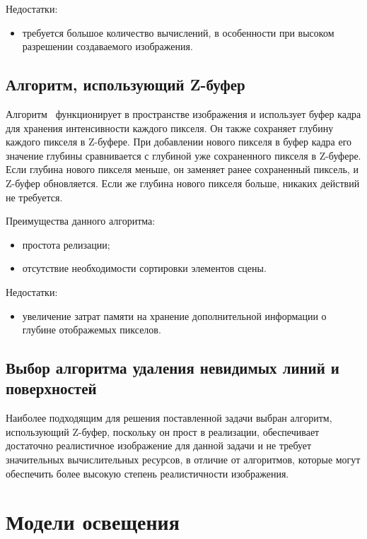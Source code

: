Недостатки:

\begin{itemize}
	\item требуется большое количество вычислений, в особенности при высоком разрешении создаваемого изображения. 
\end{itemize}

\subsection{Алгоритм, использующий Z-буфер}

Алгоритм~\cite{z_buf} функционирует в пространстве изображения и использует буфер кадра для хранения интенсивности каждого пикселя. Он также сохраняет глубину каждого пикселя в Z-буфере. При добавлении нового пикселя в буфер кадра его значение глубины сравнивается с глубиной уже сохраненного пикселя в Z-буфере. Если глубина нового пикселя меньше, он заменяет ранее сохраненный пиксель, и Z-буфер обновляется. Если же глубина нового пикселя больше, никаких действий не требуется.

Преимущества данного алгоритма:

\begin{itemize}
	\item простота релизации;
	\item отсутствие необходимости сортировки элементов сцены.  
\end{itemize}

Недостатки:

\begin{itemize}
	\item увеличение затрат памяти на хранение дополнительной информации о глубине отображемых пикселов.
\end{itemize}

\subsection*{Выбор алгоритма удаления невидимых линий и поверхностей}

Наиболее подходящим для решения поставленной задачи выбран алгоритм, использующий Z-буфер, поскольку он прост в реализации, обеспечивает достаточно реалистичное изображение для данной задачи и не требует значительных вычислительных ресурсов, в отличие от алгоритмов, которые могут обеспечить более высокую степень реалистичности изображения.

\section{Модели освещения}

